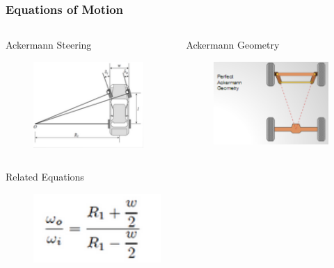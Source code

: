 \documentclass{beamer}
\begin{document}
\begin{frame}
	\frametitle{Equations of Motion}
	\begin{columns}[T]
		\begin{column}{0.5\textwidth}
			\begin{block}{Ackermann Steering}
				\begin{figure}
					\centering 
					\includegraphics[scale=.7]{figures/ackermann2.pdf} 
				\end{figure}
			\end{block}
		\end{column}		
		\begin{column}{0.5\textwidth}
			\begin{block}{Ackermann Geometry}
				\begin{figure}
					\centering
					\includegraphics[scale=.7]{figures/ackermann3.pdf}
				\end{figure}
			\end{block}	
		\end{column}
	\end{columns}
	\begin{block}{Related Equations}
		\begin{figure}
			\centering
			\includegraphics[scale=.6]{figures/ackermann4.pdf}

\end{figure}
\end{block}
\end{frame}
\end{document}
